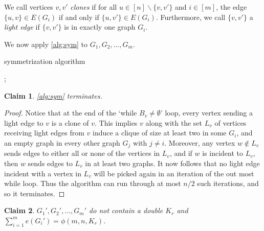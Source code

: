 \documentclass[12pt]{article}
\newtheorem{claim}{Claim}[theorem]
\begin{document}
  We call vertices $v, v'$ \textit{clones} if for all $u \in [n] \backslash \{v, v'\}$ and $i \in [m]$, the edge $\{u, v\} \in E(G_i)$ if and only if $\{u, v'\} \in E(G_i)$. Furthermore, we call $\{v, v'\}$ a \textit{light edge} if $\{v, v'\}$ is in exactly one graph $G_i$.

  We now apply \cref{alg:sym} to $G_1, G_2, \ldots, G_m$. 

  \begin{algorithm}[H]
    \caption{symmetrization algorithm}\label{alg:sym}
    \begin{algorithmic}
      \;
      \;
      \;
      \;
      \;
      ;
      \;
          \;
      \EndIf		
      \EndFor
      \EndWhile
      \EndWhile
    \end{algorithmic}
  \end{algorithm}

  \begin{claim}
    \cref{alg:sym} terminates.
  \end{claim}

  \begin{proof}
    Notice that at the end of the `while $B_v \neq \emptyset$' loop, every vertex sending a light edge to $v$ is a clone of $v$. This implies $v$ along with the set $L_v$ of vertices receiving light edges from $v$ induce a clique of size at least two in some $G_i$, and an empty graph in every other graph $G_j$ with $j \neq i$. Moreover, any vertex $w \notin L_v$ sends edges to either all or none of the vertices in $L_v$, and if $w$ is incident to $L_v$, then $w$ sends edges to $L_v$ in at least two graphs. It now follows that no light edge incident with a vertex in $L_v$ will be picked again in an iteration of the out most while loop. Thus the algorithm can run through at most $n/2$ such iterations, and so it terminates.
  \end{proof}

  \begin{claim}
    $G_1', G_2', \ldots, G_m'$ do not contain a double $K_r$ and $\sum_{i = 1}^m e(G_i') = \phi(m, n, K_r)$. 
  \end{claim}
\end{document}
